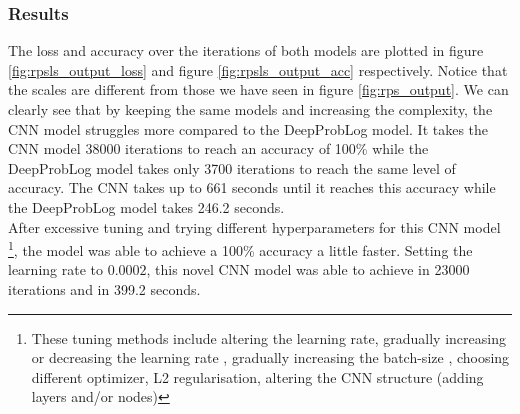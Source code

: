 \subsubsection{Results}
The loss and accuracy over the iterations of both models are plotted in figure \ref{fig:rpsls_output_loss} and figure \ref{fig:rpsls_output_acc} respectively. Notice that the scales are different from those we have seen in figure \ref{fig:rps_output}. We can clearly see that by keeping the same models and increasing the complexity, the CNN model struggles more compared to the DeepProbLog model. It takes the CNN model 38000 iterations to reach an accuracy of 100\% while the DeepProbLog model takes only 3700 iterations to reach the same level of accuracy. The CNN takes up to 661 seconds until it reaches this accuracy while the DeepProbLog model takes 246.2 seconds.
\\
After excessive tuning and trying different hyperparameters for this CNN model \footnote{These tuning methods include altering the learning rate, gradually increasing or decreasing the learning rate \cite{lr-decay}, gradually increasing the batch-size \cite{increase-batch}, choosing different optimizer, L2 regularisation, altering the CNN structure (adding layers and/or nodes)}, the model was able to achieve a 100\% accuracy a little faster.  Setting the learning rate to $0.0002$, this novel CNN model was able to achieve in 23000 iterations and in 399.2 seconds. 

